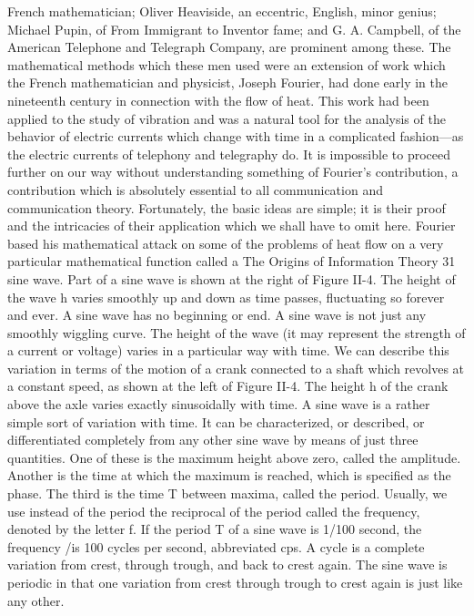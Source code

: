 French mathematician; Oliver Heaviside, an eccentric, English,
minor genius; Michael Pupin, of From Immigrant to Inventor fame;
and G. A. Campbell, of the American Telephone and Telegraph
Company, are prominent among these.
The mathematical methods which these men used were an
extension of work which the French mathematician and physicist,
Joseph Fourier, had done early in the nineteenth century in connection
with the flow of heat. This work had been applied to the study
of vibration and was a natural tool for the analysis of the behavior
of electric currents which change with time in a complicated fashion—as
the electric currents of telephony and telegraphy do.
It is impossible to proceed further on our way without understanding
something of Fourier’s contribution, a contribution which
is absolutely essential to all communication and communication
theory. Fortunately, the basic ideas are simple; it is their proof and
the intricacies of their application which we shall have to omit here.
Fourier based his mathematical attack on some of the problems
of heat flow on a very particular mathematical function called a
The Origins of Information Theory
31
sine wave. Part of a sine wave is shown at the right of Figure II-4.
The height of the wave h varies smoothly up and down as time
passes, fluctuating so forever and ever. A sine wave has no beginning
or end. A sine wave is not just any smoothly wiggling curve.
The height of the wave (it may represent the strength of a current
or voltage) varies in a particular way with time. We can describe
this variation in terms of the motion of a crank connected to a shaft
which revolves at a constant speed, as shown at the left of Figure
II-4. The height h of the crank above the axle varies exactly
sinusoidally with time.
A sine wave is a rather simple sort of variation with time. It can
be characterized, or described, or differentiated completely from
any other sine wave by means of just three quantities. One of these
is the maximum height above zero, called the amplitude. Another
is the time at which the maximum is reached, which is specified
as the phase. The third is the time T between maxima, called the
period. Usually, we use instead of the period the reciprocal of the
period called the frequency, denoted by the letter f. If the period
T of a sine wave is 1/100 second, the frequency /is 100 cycles per
second, abbreviated cps. A cycle is a complete variation from
crest, through trough, and back to crest again. The sine wave is
periodic in that one variation from crest through trough to crest
again is just like any other.

